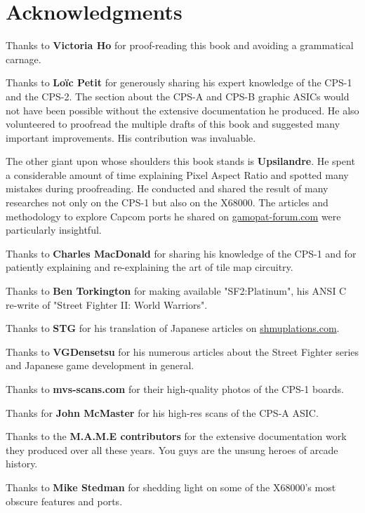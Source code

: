 \chapter*{Acknowledgments} 

Thanks to \textbf{Victoria Ho} for proof-reading this book and avoiding a grammatical carnage.

Thanks to \textbf{Lo\"{i}c Petit} for generously sharing his expert knowledge of the CPS-1 and the CPS-2. The section about the CPS-A and CPS-B graphic ASICs would not have been possible without the extensive documentation he produced. He also volunteered to proofread the multiple drafts of this book and suggested many important improvements. His contribution was invaluable.

The other giant upon whose shoulders this book stands is \textbf{Upsilandre}. He spent a considerable amount of time explaining Pixel Aspect Ratio and spotted many mistakes during proofreading. He conducted and shared the result of many researches not only on the CPS-1 but also on the X68000. The articles and methodology to explore Capcom ports he shared on \href{https://www.gamopat-forum.com}{gamopat-forum.com} were particularly insightful.

Thanks to \textbf{Charles MacDonald} for sharing his knowledge of the CPS-1 and for patiently explaining and re-explaining the art of tile map circuitry.

Thanks to \textbf{Ben Torkington} for making available "SF2:Platinum", his ANSI C re-write of "Street Fighter II: World Warriors".

Thanks to \textbf{STG} for his translation of Japanese articles on \href{https://shmuplations.com}{shmuplations.com}.

Thanks to \textbf{VGDensetsu} for his numerous articles about the Street Fighter series and Japanese game development in general.

Thanks to \textbf{mvs-scans.com} for their high-quality photos of the CPS-1 boards.

Thanks for \textbf{John McMaster} for his high-res scans of the CPS-A ASIC.

Thanks to the \textbf{M.A.M.E contributors} for the extensive documentation work they produced over all these years. You guys are the unsung heroes of arcade history.

Thanks to \textbf{Mike Stedman} for shedding light on some of the X68000's most obscure features and ports.